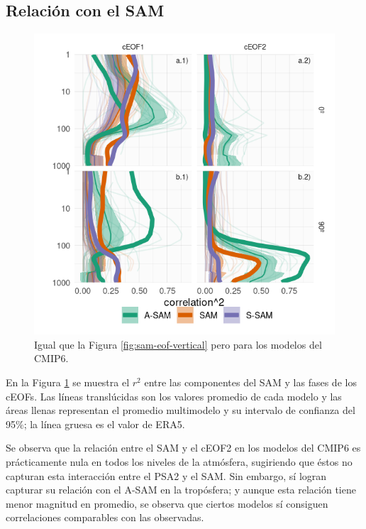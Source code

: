 \documentclass[12pt,oneside,a4paper]{reedthesis}
\begin{document}
\hypertarget{relaciuxf3n-con-el-sam}{%
\subsection{Relación con el SAM}\label{relaciuxf3n-con-el-sam}}

\begin{figure}

{\centering \includegraphics{figures/50-cmip6/cor-sam-cmip6-1} 

}

\caption{Igual que la Figura \ref{fig:sam-eof-vertical} pero para los modelos del CMIP6.}\label{fig:cor-sam-cmip6}
\end{figure}



En la Figura \ref{fig:cor-sam-cmip6} se muestra el \(r^2\) entre las componentes del SAM y las fases de los cEOFs.
Las líneas translúcidas son los valores promedio de cada modelo y las áreas llenas representan el promedio multimodelo y su intervalo de confianza del 95\%; la línea gruesa es el valor de ERA5.

Se observa que la relación entre el SAM y el cEOF2 en los modelos del CMIP6 es prácticamente nula en todos los niveles de la atmósfera, sugiriendo que éstos no capturan esta interacción entre el PSA2 y el SAM.
Sin embargo, sí logran capturar su relación con el A-SAM en la tropósfera; y aunque esta relación tiene menor magnitud en promedio, se observa que ciertos modelos sí consiguen correlaciones comparables con las observadas.
\end{document}
